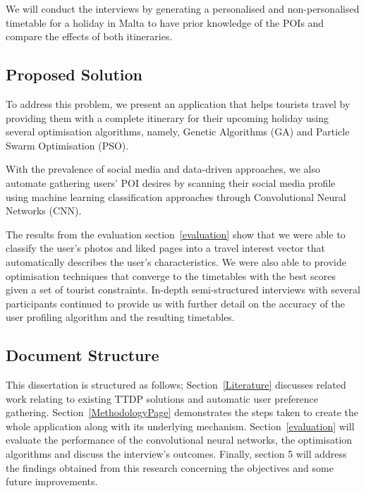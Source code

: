 We will conduct the interviews by generating a
personalised and non-personalised timetable for a
holiday in Malta to have prior knowledge of the POIs
and compare the effects of both itineraries.



\subsection{Proposed Solution}

To address this problem, we present an application
that helps tourists travel by providing them with a
complete itinerary for their upcoming holiday using
several optimisation algorithms, namely, Genetic
Algorithms (GA) and Particle Swarm Optimisation (PSO).

With the prevalence of social media and data-driven
approaches, we also automate gathering users' POI
desires by scanning their social media profile using
machine learning classification approaches through
Convolutional Neural Networks (CNN).

The results from the evaluation section~\ref{evaluation}
show that we were able to classify the user's photos
and liked pages into a travel interest vector that automatically
describes the user's characteristics. We were also able to provide optimisation
techniques that converge to the timetables with the
best scores given a set of tourist constraints.
In-depth semi-structured interviews with several
participants continued to provide us with further
detail on the accuracy of the user profiling algorithm
and the resulting timetables. 

\subsection{Document Structure}

This dissertation is structured as follows; Section~\ref{Literature}
discusses related work relating to existing TTDP
solutions and automatic user preference gathering.
Section~\ref{MethodologyPage} demonstrates the steps taken to create the
whole application along with its underlying mechanism.
Section~\ref{evaluation} will evaluate the performance of the
convolutional neural networks, the optimisation
algorithms and discuss the interview's outcomes.
Finally, section 5 will address the findings obtained
from this research concerning the objectives and some
future improvements.

